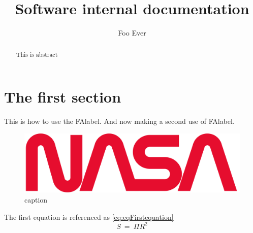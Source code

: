 \documentclass[a4paper,10pt]{article}
\title{Software internal documentation}
\author{Foo Ever}
\begin{document}
\maketitle
\begin{abstract}
This is abstract
\end{abstract}
\printnomenclature
\printglossaries


\section{The first section}
This is how to use the \gls{FAlabel}. And now making a second use of \gls{FAlabel}.
\cite{uncleDT}

\begin{figure}[ht]
	\centering
	\includegraphics[width=0.75 \textwidth]{resources/project_or_company_logo.png}
	\caption{caption}
	\label{reference}
\end{figure}

The first equation is referenced as \ref{eq:eqFirstequation}
\begin{equation}
S~=~\Pi R^2
\label{eq:eqFirstequation}
\end{equation}

\printbibliography
\end{document}
